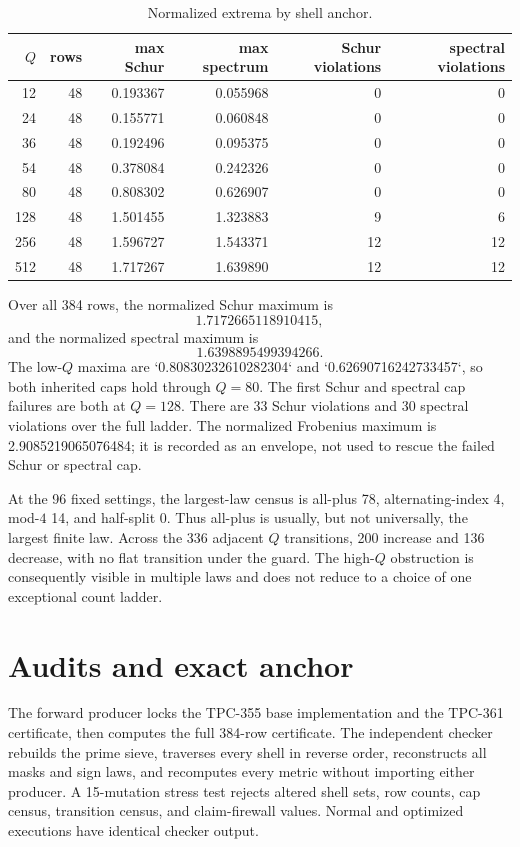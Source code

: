 \documentclass[10pt]{article}
\begin{document}
\begin{table}[t]
\centering
\caption{Normalized extrema by shell anchor.}
\label{tab:q}
\small
\begin{tabular}{r r r r r r}
\toprule
$Q$ & rows & max Schur & max spectrum & Schur violations & spectral violations\\
\midrule
12  & 48 & 0.193367 & 0.055968 & 0 & 0\\
24  & 48 & 0.155771 & 0.060848 & 0 & 0\\
36  & 48 & 0.192496 & 0.095375 & 0 & 0\\
54  & 48 & 0.378084 & 0.242326 & 0 & 0\\
80  & 48 & 0.808302 & 0.626907 & 0 & 0\\
128 & 48 & 1.501455 & 1.323883 & 9 & 6\\
256 & 48 & 1.596727 & 1.543371 & 12 & 12\\
512 & 48 & 1.717267 & 1.639890 & 12 & 12\\
\bottomrule
\end{tabular}
\end{table}

Over all 384 rows, the normalized Schur maximum is
\[
 1.7172665118910415,
\]
and the normalized spectral maximum is
\[
 1.6398895499394266.
\]
The low-$Q$ maxima are `0.80830232610282304` and
`0.62690716242733457`, so both inherited caps hold through $Q=80$.  The
first Schur and spectral cap failures are both at $Q=128$.  There are 33
Schur violations and 30 spectral violations over the full ladder.  The
normalized Frobenius maximum is 2.9085219065076484; it is recorded as an
envelope, not used to rescue the failed Schur or spectral cap.

At the 96 fixed settings, the largest-law census is all-plus 78,
alternating-index 4, mod-$4$ 14, and half-split 0.  Thus all-plus is usually,
but not universally, the largest finite law.  Across the 336 adjacent $Q$
transitions, 200 increase and 136 decrease, with no flat transition under the
guard.  The high-$Q$ obstruction is consequently visible in multiple laws and
does not reduce to a choice of one exceptional count ladder.

\section{Audits and exact anchor}

The forward producer locks the TPC-355 base implementation and the TPC-361
certificate, then computes the full 384-row certificate.  The independent
checker rebuilds the prime sieve, traverses every shell in reverse order,
reconstructs all masks and sign laws, and recomputes every metric without
importing either producer.  A 15-mutation stress test rejects altered shell
sets, row counts, cap census, transition census, and claim-firewall values.
Normal and optimized executions have identical checker output.
\end{document}
